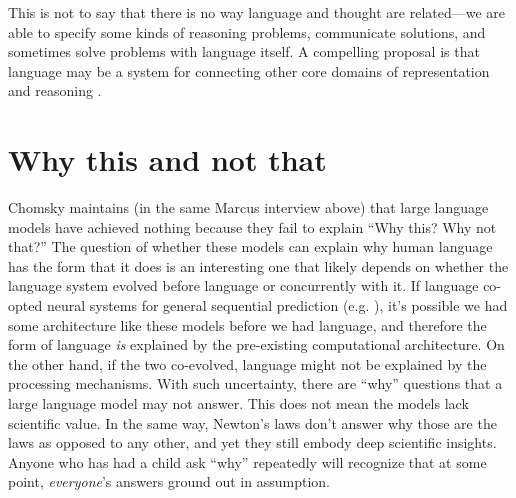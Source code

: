 \documentclass[output=paper,colorlinks,citecolor=brown
]{langscibook}
\begin{document}
This is not to say that there is no way language and thought are related---we are able to specify some kinds of reasoning problems, communicate solutions, and sometimes solve problems with language itself. A compelling proposal is that language may be a system for connecting other core domains of representation and reasoning \citep{spelke2003makes}. %


\section*{Why this and not that}

Chomsky maintains (in the same Marcus interview above) that large language models have achieved nothing because they fail to explain  ``Why this?  Why not that?'' The question of whether these models can explain why human language has the form that it does is an interesting one that likely depends on whether the language system evolved before language or concurrently with it. If language co-opted neural systems for general sequential prediction (e.g. \cite{christiansen2015language}), it's possible we had some architecture like these models before we had language, and therefore the form of language \emph{is} explained by the pre-existing computational architecture. On the other hand, if the two co-evolved, language might not be explained by the processing mechanisms. With such uncertainty,  there are ``why'' questions that a large language model may not answer. This does not mean the models lack scientific value. In the same way, Newton's laws don't answer why those are the laws as opposed to any other, and yet they still embody deep scientific insights. Anyone who has had a child ask ``why'' repeatedly will recognize that at some point, \emph{everyone}'s answers ground out in assumption. 
\end{document}
